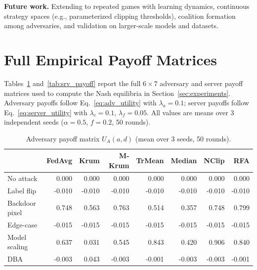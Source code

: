 \documentclass{article}
\begin{document}
\textbf{Future work.} Extending to repeated games with learning dynamics, continuous strategy spaces (e.g., parameterized clipping thresholds), coalition formation among adversaries, and validation on larger-scale models and datasets.




\appendix
\section{Full Empirical Payoff Matrices}
\label{app:payoff}

Tables~\ref{tab:adv_payoff} and~\ref{tab:srv_payoff} report the full $6 \times 7$ adversary and server payoff matrices used to compute the Nash equilibria in Section~\ref{sec:experiments}. Adversary payoffs follow Eq.~\ref{eq:adv_utility} with $\lambda_a = 0.1$; server payoffs follow Eq.~\ref{eq:server_utility} with $\lambda_c = 0.1$, $\lambda_f = 0.05$. All values are means over 3 independent seeds ($\alpha=0.5$, $f=0.2$, 50 rounds).

\begin{table}[h]
\caption{Adversary payoff matrix $U_A(a,d)$ (mean over 3 seeds, 50 rounds).}
\label{tab:adv_payoff}
\centering
\small
\begin{tabular}{l|rrrrrrr}
\toprule
 & FedAvg & Krum & M-Krum & TrMean & Median & NClip & RFA \\
\midrule
No attack      &  0.000 &  0.000 &  0.000 &  0.000 &  0.000 &  0.000 &  0.000 \\
Label flip     & -0.010 & -0.010 & -0.010 & -0.010 & -0.010 & -0.010 & -0.010 \\
Backdoor pixel &  0.748 &  0.563 &  0.763 &  0.514 &  0.357 &  0.748 &  0.799 \\
Edge-case      & -0.015 & -0.015 & -0.015 & -0.015 & -0.015 & -0.015 & -0.015 \\
Model scaling  &  0.637 &  0.031 &  0.545 &  0.843 &  0.420 &  0.906 &  0.840 \\
DBA            & -0.003 &  0.043 & -0.003 & -0.001 & -0.003 & -0.003 & -0.001 \\
\bottomrule
\end{tabular}
\end{table}
\end{document}
